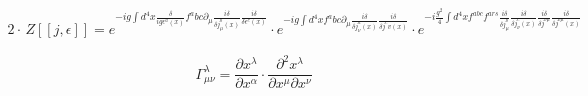 \documentclass{article}
\begin{document}
\begin{equation*}
\begin{split}
2\cdot \, Z[[j,\epsilon]]= e^{-ig\int {d^4 x \frac{\delta}{ig\epsilon^a (x)} f^abc \partial_\mu \frac{i\delta}{\delta j^b_\mu (x)} \frac{i\delta}{\delta \epsilon^c (x)}}} \cdot e^{-ig\int {d^4 x f^abc \partial_\mu \frac{i\delta}{\delta j^a_\nu (x)}\frac{i\delta }{\delta j^cv (x)}}} \cdot e^{-i\frac{g^2}{4}\int{d^4 x f^{abc} f^{ars} \frac{i\delta }{\delta j^b_\mu } \frac{i\delta}{\delta j^c_\nu (x)}\frac{i\delta}{\delta j^{\nu \mu}}\frac{i\delta }{\delta j^{\nu \mu }(x)}}}
\end{split}
\end{equation*}

\begin{equation*}
\Gamma^\lambda_{\mu \nu}= \frac{\partial x^\lambda}{\partial x^\alpha}\cdot \frac{\partial^2 x^\lambda}{\partial x^\mu \partial x^\nu}
\end{equation*}
\end{document}
